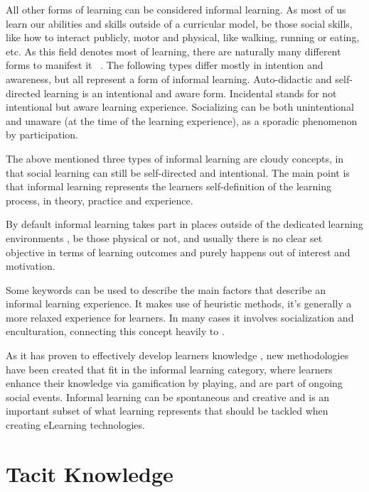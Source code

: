 All other forms of learning can be considered informal learning. As most of us learn
our abilities and skills outside of a curricular model, be those social skills, 
like how to interact publicly, motor and physical, like walking, running or eating,
etc. As this field denotes most of learning, there are naturally many different 
forms to manifest it ~\cite{theformsofinformallearning}. The following types 
differ mostly in intention and awareness, but all represent a form of informal
learning. Auto-didactic and self-directed learning is an intentional and aware form. 
Incidental stands for not intentional but aware learning experience. Socializing 
can be both unintentional and unaware (at the time of the learning experience), as 
a sporadic phenomenon by participation.

The above mentioned three types of informal learning are cloudy concepts, in that
social learning can still be self-directed and intentional. The main point 
is that informal learning represents the learners self-definition of the learning
process, in theory, practice and experience.

By default informal learning takes part in places outside of the dedicated learning
environments \cite{bridginginschoolandoutofschoollearning}, be those physical 
or not, and usually there is no clear set objective in terms of learning outcomes 
and purely happens out of interest and motivation.

Some keywords can be used to describe the main factors that describe an informal 
learning experience. It makes use of heuristic methods, it's generally a more relaxed
experience for learners. In many cases it involves socialization and enculturation, 
connecting this concept heavily to . 

As it has proven to effectively develop learners knowledge 
\cite{bridginginschoolandoutofschoollearning}, new methodologies have been created
that fit in the informal learning category, where learners enhance their knowledge
via gamification by playing, and are part of ongoing social events. Informal learning
can be spontaneous and creative and is an important subset of what learning represents
that should be tackled when creating eLearning technologies.




\section{Tacit Knowledge}
\label{section:tacit_knowledge}

